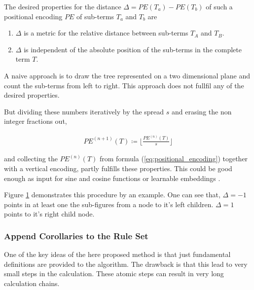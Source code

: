 \documentclass{scrartcl}
\theoremstyle{definition}
\begin{document}
The desired properties for the distance $\Delta= PE\left( T_a \right) - PE\left( T_b \right)$ of such a positional encoding $PE$ of sub-terms $T_a$ and $T_b$ are
\begin{enumerate}[label=(\roman*)]
	\item $\Delta$ is a metric for the relative distance between sub-terms $T_A$ and $T_B$.
	\item $\Delta$ is independent of the absolute position of the sub-terms in the complete term $T$.
\end{enumerate}

A naive approach is to draw the tree represented on a two dimensional plane and count the sub-terms from left to right.
This approach does not fullfil any of the desired properties.

But dividing these numbers iteratively by the spread $s$ and erasing the non integer fractions out,

\begin{align}
	PE^{(n+1)}\left( T \right) \coloneqq \lfloor \frac{PE^{(n)} \left( T \right)}{s} \rfloor
	\label{eq:positional_encoding}
\end{align}

and collecting the $PE^{(n)}\left( T \right)$ from formula (\ref{eq:positional_encoding}) together with a vertical encoding, partly fulfills these properties.
This could be good enough as input for sine and cosine functions or learnable embeddings \cite{gehring2017convolutional}.

\begin{figure}[!htbp]
	\centering
	
	\label{fig:positional_encoding}
\end{figure}

Figure \ref{fig:positional_encoding} demonstrates this procedure by an example.
One can see that, $\Delta=-1$ points in at least one the sub-figures from a node to it's left children. $\Delta=1$ points to it's right child node. 


\subsubsection{Append Corollaries to the Rule Set}

One of the key ideas of the here proposed method is that just fundamental definitions are provided to the algorithm.
The drawback is that this lead to very small steps in the calculation.
These atomic steps can result in very long calculation chains.%
\end{document}

